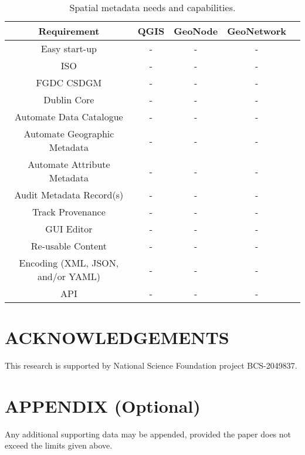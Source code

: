 \documentclass{isprs} %
\begin{document}
\begin{table*}[h]
	\centering
		\begin{tabular}{|c|c|c|c|c|}\hline
		    Requirement&QGIS&GeoNode&GeoNetwork\\\hline
			 Easy start-up & - & - & - \\
			 ISO & - & - & - \\
			 FGDC CSDGM & - & - & - \\
			 Dublin Core & - & - & - \\
			 Automate Data Catalogue & - & - & - \\
			 Automate Geographic Metadata & - & - & - \\
			 Automate Attribute Metadata & - & - & - \\
			 Audit Metadata Record(s) & - & - & - \\
			 Track Provenance & - & - & - \\
 			 GUI Editor & - & - & - \\
 			 Re-usable Content & - & - & - \\
			 Encoding (XML, JSON, and/or YAML) & - & - & - \\
			 API & - & - & - \\\hline
		\end{tabular}
	\caption{Spatial metadata needs and capabilities.}
\label{tab:Metadata_Software}
\end{table*}

\section*{ACKNOWLEDGEMENTS}\label{ACKNOWLEDGEMENTS}
This research is supported by National Science Foundation project BCS-2049837.

{
	\begin{spacing}{1.17}
		\normalsize
	\end{spacing}
}

\section*{APPENDIX (Optional)}\label{APPENDIX}

Any additional supporting data may be appended, provided the paper does not exceed the limits given above. 
\end{document}
